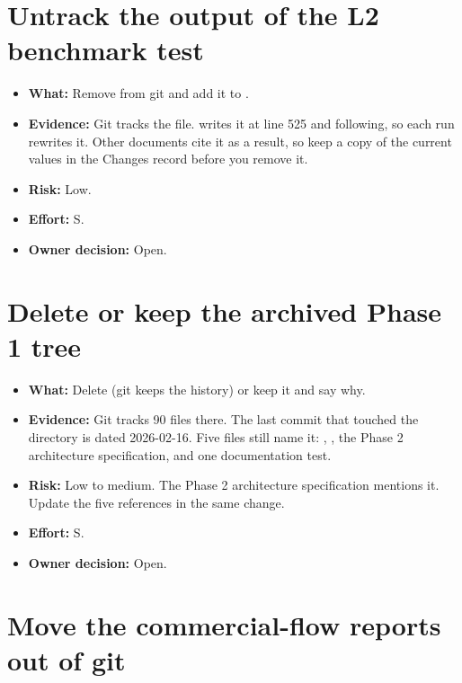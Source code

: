 \section{Untrack the output of the L2 benchmark test}\label{um:guide:cleanup-recommendations:l2-bench-results}

\begin{itemize}
\item \textbf{What:} Remove  from git and add it to .
\item \textbf{Evidence:} Git tracks the file.  writes it at line 525 and following, so each run rewrites it. Other documents cite it as a result, so keep a copy of the current values in the Changes record before you remove it.
\item \textbf{Risk:} Low.
\item \textbf{Effort:} S.
\item \textbf{Owner decision:} Open.
\end{itemize}

\section{Delete or keep the archived Phase 1 tree}\label{um:guide:cleanup-recommendations:micro-p}

\begin{itemize}
\item \textbf{What:} Delete  (git keeps the history) or keep it and say why.
\item \textbf{Evidence:} Git tracks 90 files there. The last commit that touched the directory is dated 2026-02-16. Five files still name it: , , the Phase 2 architecture specification,  and one documentation test.
\item \textbf{Risk:} Low to medium. The Phase 2 architecture specification mentions it. Update the five references in the same change.
\item \textbf{Effort:} S.
\item \textbf{Owner decision:} Open.
\end{itemize}

\section{Move the commercial-flow reports out of git}\label{um:guide:cleanup-recommendations:commercial-reports}

